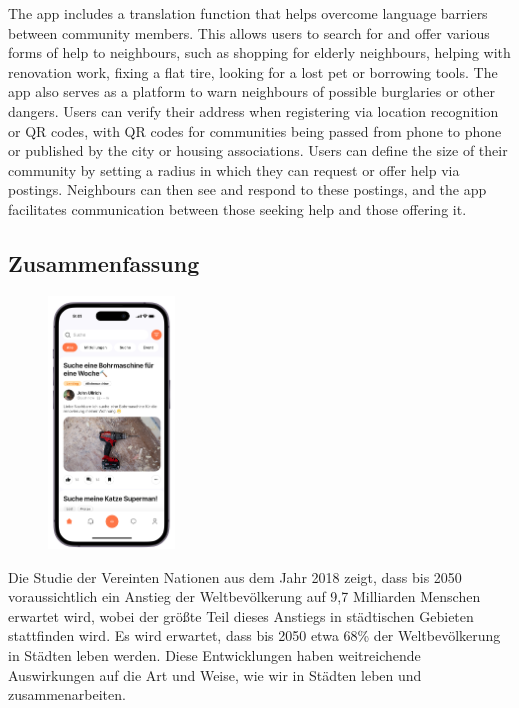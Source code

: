 The app includes a translation function that helps overcome language barriers between community members. This allows users to search for and offer various forms of help to neighbours, such as shopping for elderly neighbours, helping with renovation work, fixing a flat tire, looking for a lost pet or borrowing tools. The app also serves as a platform to warn neighbours of possible burglaries or other dangers. Users can verify their address when registering via location recognition or QR codes, with QR codes for communities being passed from phone to phone or published by the city or housing associations. Users can define the size of their community by setting a radius in which they can request or offer help via postings. Neighbours can then see and respond to these postings, and the app facilitates communication between those seeking help and those offering it.
\newpage
\begin{spacing}{1}
  \chapter*{Zusammenfassung}
\end{spacing}
\begin{figure}
  \begin{center}
    \includegraphics[width=0.3\textwidth]{pics/iphone.png}
  \end{center}
\end{figure}
Die Studie der Vereinten Nationen \cite{un2018world} aus dem Jahr 2018 zeigt, dass bis 2050 voraussichtlich ein Anstieg der Weltbevölkerung auf 9,7 Milliarden Menschen erwartet wird, wobei der größte Teil dieses Anstiegs in städtischen Gebieten stattfinden wird. Es wird erwartet, dass bis 2050 etwa 68\% der Weltbevölkerung in Städten leben werden. Diese Entwicklungen haben weitreichende Auswirkungen auf die Art und Weise, wie wir in Städten leben und zusammenarbeiten.


